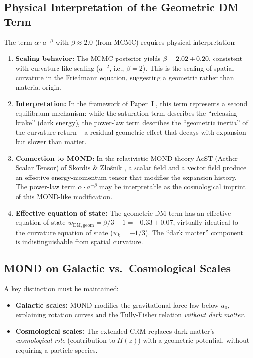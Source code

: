 \documentclass[aps,prd,twocolumn,superscriptaddress,nofootinbib]{revtex4-2}
\begin{document}
\subsection{Physical Interpretation of the Geometric DM Term}

The term $\alpha \cdot a^{-\beta}$ with $\beta \approx 2.0$ (from MCMC) requires physical interpretation:

\begin{enumerate}
\item \textbf{Scaling behavior:} The MCMC posterior yields $\beta = 2.02 \pm 0.20$, consistent with curvature-like scaling ($a^{-2}$, i.e., $\beta = 2$). This is the scaling of spatial curvature in the Friedmann equation, suggesting a geometric rather than material origin.

\item \textbf{Interpretation:} In the framework of Paper~I \cite{Geiger2026}, this term represents a second equilibrium mechanism: while the saturation term describes the ``releasing brake'' (dark energy), the power-law term describes the ``geometric inertia'' of the curvature return -- a residual geometric effect that decays with expansion but slower than matter.

\item \textbf{Connection to MOND:} In the relativistic MOND theory AeST (Aether Scalar Tensor) of Skordis \& Z{\l}o\'snik \cite{Skordis2021}, a scalar field and a vector field produce an effective energy-momentum tensor that modifies the expansion history. The power-law term $\alpha \cdot a^{-\beta}$ may be interpretable as the cosmological imprint of this MOND-like modification.

\item \textbf{Effective equation of state:} The geometric DM term has an effective equation of state $w_{\mathrm{DM,geom}} = \beta/3 - 1 = -0.33 \pm 0.07$, virtually identical to the curvature equation of state ($w_k = -1/3$). The ``dark matter'' component is indistinguishable from spatial curvature.
\end{enumerate}

\subsection{MOND on Galactic vs.\ Cosmological Scales}

A key distinction must be maintained:
\begin{itemize}
\item \textbf{Galactic scales:} MOND modifies the gravitational force law below $a_0$, explaining rotation curves and the Tully-Fisher relation \textit{without dark matter}.
\item \textbf{Cosmological scales:} The extended CRM replaces dark matter's \textit{cosmological role} (contribution to $H(z)$) with a geometric potential, without requiring a particle species.
\end{itemize}
\end{document}
